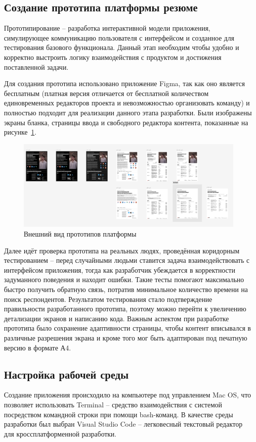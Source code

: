 \documentclass[master, och, coursework]{SCWorks}
\begin{document}
\subsection{Создание прототипа платформы резюме}
Прототипирование – разработка интерактивной модели приложения, симулирующее коммуникацию 
пользователя с интерфейсом и созданное для тестирования базового функционала. 
Данный этап необходим чтобы удобно и корректно выстроить логику взаимодействия с продуктом 
и достижения поставленной задачи.

Для создания прототипа использовано приложение Figma, так как оно является бесплатным 
(платная версия отличается от бесплатной количеством единовременных редакторов проекта 
и невозможностью организовать команду) и полностью подходит для реализации данного 
этапа разработки. Были изображены экраны бланка, страницы ввода и свободного
редактора контента, показанные на рисунке~\ref{fig:21}.

\begin{figure}[!ht]
    \centering
    \includegraphics[width=12cm]{images/image21.png}
    \caption{\label{fig:21}%
        Внешний вид прототипов платформы}
\end{figure}

Далее идёт проверка прототипа на реальных людях, проведённая коридорным 
тестированием – перед случайными людьми ставится задача взаимодействовать 
с интерфейсом приложения, тогда как разработчик убеждается 
в корректности задуманного поведения и находит ошибки. 
Такие тесты помогают максимально быстро получить обратную связь, потратив
минимальное количество времени на поиск респондентов.
Результатом тестирования стало подтверждение правильности
разработанного прототипа, поэтому можно перейти к увеличению 
детализации экранов и написанию кода. Важным аспектом при разработке прототипа
было сохранение адаптивности страницы, чтобы контент вписывался в различные разрешения
экрана и кроме того мог быть адаптирован под печатную версию в формате А4.


\subsection{Настройка рабочей среды}
Создание приложения происходило на компьютере под управлением Mac OS, 
что позволяет использовать Terminal – средство взаимодействия с системой 
посредством командной строки при помощи bash-команд. В качестве среды 
разработки был выбран Visual Studio Code – легковесный текстовый редактор
для кроссплатформенной разработки.
\end{document}
